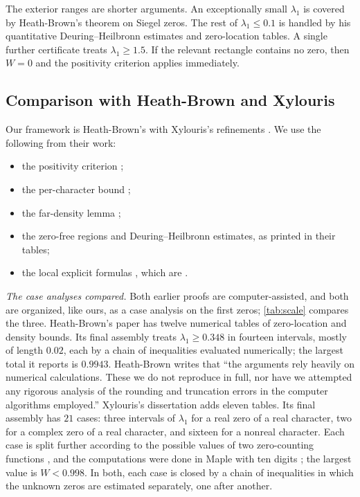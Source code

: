 The exterior ranges are shorter arguments. An exceptionally small $\lambda_1$ is covered
by Heath-Brown's theorem on Siegel zeros. The rest of $\lambda_1\le0.1$ is handled by his
quantitative Deuring--Heilbronn estimates and zero-location tables. A single further
certificate treats $\lambda_1\ge1.5$. If the relevant rectangle contains no zero, then
$W=0$ and the positivity criterion applies immediately.

\subsection{Comparison with Heath-Brown and Xylouris}\label{subsec:compare}

Our framework is Heath-Brown's \cite{HeathBrown1992zero} with Xylouris's refinements
\cite{Xylouris2011nullstellen,Xylouris2018linnik}. We use the following from their work:
\begin{itemize}
  \item the positivity criterion \cite[(3.57)]{Xylouris2011nullstellen};
  \item the per-character bound \cite[Lemma~3.10]{Xylouris2011nullstellen};
  \item the far-density lemma \cite[Lemma~5.1]{Xylouris2011nullstellen};
  \item the zero-free regions and Deuring--Heilbronn estimates, as printed in their tables;
  \item the local explicit formulas \cite[Lemmas~3.1, 3.2]{Xylouris2011nullstellen}, which are
    \cite[Lemmas~5.3, 5.2]{HeathBrown1992zero}.
\end{itemize}

\emph{The case analyses compared.} Both earlier proofs are computer-assisted, and both are
organized, like ours, as a case analysis on the first zeros; \cref{tab:scale} compares the three.
Heath-Brown's paper has twelve numerical tables of zero-location and density bounds. Its final
assembly \cite[\S15]{HeathBrown1992zero} treats $\lambda_1\ge0.348$ in fourteen intervals, mostly of length
$0.02$, each by a chain of inequalities evaluated numerically; the largest total it reports is
$0.9943$. Heath-Brown writes \cite[\S1]{HeathBrown1992zero} that ``the arguments rely heavily on
numerical calculations. These we do not reproduce in full, nor have we attempted any rigorous
analysis of the rounding and truncation errors in the computer algorithms employed.'' Xylouris's
dissertation adds eleven tables. Its final assembly \cite[\S6.4, pp.~86--87]{Xylouris2011nullstellen}
has $21$ cases: three intervals of $\lambda_1$ for a real zero of a real character, two for a complex
zero of a real character, and sixteen for a nonreal character. Each case is split further
according to the possible values of two zero-counting functions
\cite[(6.46)]{Xylouris2011nullstellen}, and the computations were done in Maple with ten digits
\cite[p.~14]{Xylouris2011nullstellen}; the largest value is $W<0.998$. In both, each case is closed by a
chain of inequalities in which the unknown zeros are estimated separately, one after another.


